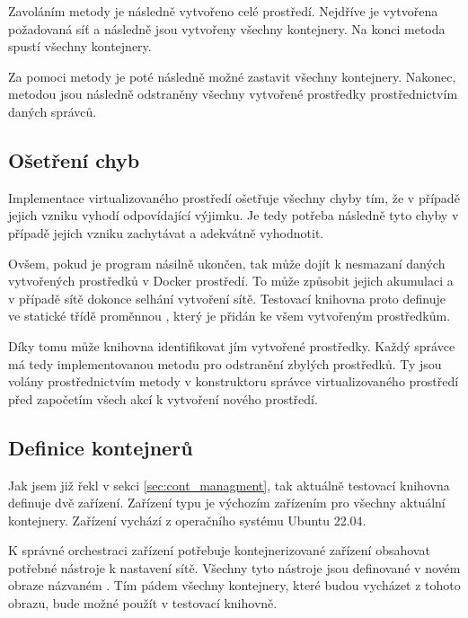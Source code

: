 Zavoláním metody  je následně vytvořeno celé prostředí. Nejdříve je vytvořena požadovaná síť a následně jsou vytvořeny všechny kontejnery. Na konci metoda spustí všechny kontejnery.

Za pomoci metody  je poté následně možné zastavit všechny kontejnery. Nakonec, metodou  jsou následně odstraněny všechny vytvořené prostředky prostřednictvím daných správců. 

\subsection{Ošetření chyb}

Implementace virtualizovaného prostředí ošetřuje všechny chyby tím, že v případě jejich vzniku vyhodí odpovídající výjimku. Je tedy potřeba následně tyto chyby v případě jejich vzniku zachytávat a adekvátně vyhodnotit.

Ovšem, pokud je program násilně ukončen, tak může dojít k nesmazaní daných vytvořených prostředků v Docker prostředí. To může způsobit jejich akumulaci a v případě sítě dokonce selhání vytvoření sítě. Testovací knihovna proto definuje ve statické třídě  proměnnou , který je přidán ke všem vytvořeným prostředkům.

Díky tomu může knihovna identifikovat jím vytvořené prostředky. Každý správce má tedy implementovanou metodu pro odstranění zbylých prostředků. Ty jsou volány prostřednictvím metody  v konstruktoru správce virtualizovaného prostředí před započetím všech akcí k vytvoření nového prostředí.

\subsection{Definice kontejnerů}

Jak jsem již řekl v sekci \ref{sec:cont_managment}, tak aktuálně testovací knihovna definuje dvě zařízení. Zařízení typu  je výchozím zařízením pro všechny aktuální kontejnery. Zařízení vychází z operačního systému Ubuntu 22.04. 

K správné orchestraci zařízení potřebuje kontejnerizované zařízení obsahovat potřebné nástroje k nastavení sítě. Všechny tyto nástroje jsou definované v novém obraze názvaném . Tím pádem všechny kontejnery, které budou vycházet z tohoto obrazu, bude možné použít v testovací knihovně. 


